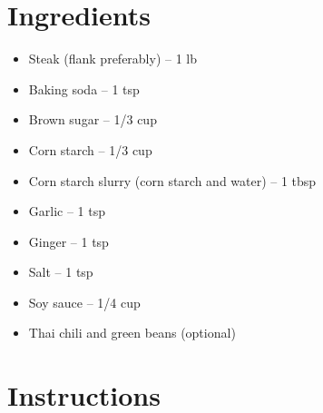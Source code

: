 




\section*{Ingredients}

\begin{itemize}
      \item Steak (flank preferably) – 1 lb
      \item[\measure] Baking soda – 1 tsp
      \item[\measure] Brown sugar – 1/3 cup
      \item[\measure] Corn starch – 1/3 cup
      \item[\measure] Corn starch slurry (corn starch and water) – 1 tbsp
      \item[\cut] Garlic – 1 tsp
      \item[\cut] Ginger – 1 tsp
      \item[\measure] Salt – 1 tsp
      \item[\measure] Soy sauce – 1/4 cup
      \item[\cut] Thai chili and green beans (optional)
\end{itemize}

\newpage
{}
\section*{Instructions}


